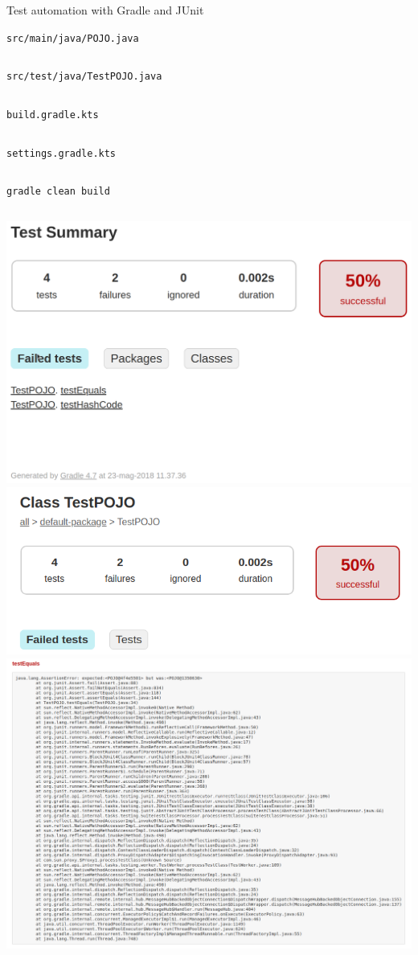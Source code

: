 \documentclass[presentation]{beamer}
\newcommand{\codefile}[4]{
	\begin{block}{\texttt{#2}}
		\inputminted[fontsize=#3,linenos=true,breaklines=true]{#4}{"workspace/#1/#2"}
	\end{block}
}
\newcommand{\java}[3]{\codefile{#1}{#2}{#3}{java}}
\newcommand{\kotlin}[3]{\codefile{#1}{#2}{#3}{kotlin}}
\newcommand{\terminal}[3]{\codefile{#1}{#2}{#3}{text}}
\newcommand{\tinier}{\fontsize{4pt}{5pt}\selectfont}
\begin{document}
\begin{frame}{Test automation with Gradle and JUnit}
    \java{15-Test}{src/main/java/POJO.java}{\tinier}
    \java{15-Test}{src/test/java/TestPOJO.java}{\tinier}
    \kotlin{15-Test}{build.gradle.kts}{\scriptsize}
    \kotlin{15-Test}{settings.gradle.kts}{\normalsize}
    \terminal{15-Test}{gradle clean build}{\tiny}
    \centering
    \includegraphics[width=.9\textwidth,height=.8\textheight,keepaspectratio]{img/gradleTestReport0}
    \includegraphics[width=.9\textwidth,height=.8\textheight,keepaspectratio]{img/gradleTestReport1}
    \includegraphics[width=.9\textwidth,height=.8\textheight,keepaspectratio]{img/gradleTestReport2}

\end{frame}
\end{document}
